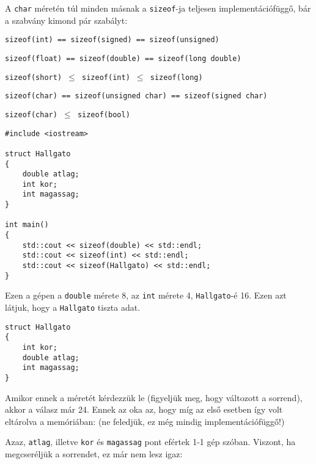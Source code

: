 \documentclass[a4paper,11.5pt,table]{article}
\begin{document}
	\medskip
	A \texttt{char} méretén túl minden másnak a \texttt{sizeof}-ja teljesen implementációfüggő, bár a szabvány kimond pár szabályt:
	\begin{center}
		\texttt{sizeof(int) == sizeof(signed) == sizeof(unsigned)}
		\smallskip
		
		\texttt{sizeof(float) == sizeof(double) == sizeof(long double)}
		\smallskip
		
		\texttt{sizeof(short) $\leq$ sizeof(int) $\leq$ sizeof(long)}
		\smallskip
		
		\texttt{sizeof(char) == sizeof(unsigned char) == sizeof(signed char)}
		\smallskip
		
		\texttt{sizeof(char) $\leq$ sizeof(bool)}
		\smallskip
	\end{center}
	\begin{lstlisting}
#include <iostream>

struct Hallgato
{
	double atlag;
	int kor;
	int magassag;
}

int main()
{
	std::cout << sizeof(double) << std::endl;
	std::cout << sizeof(int) << std::endl;
	std::cout << sizeof(Hallgato) << std::endl;
}
	\end{lstlisting}
	Ezen a gépen a \texttt{double} mérete 8, az \texttt{int} mérete 4, \texttt{Hallgato}-é 16. Ezen azt látjuk, hogy a \texttt{Hallgato} tiszta adat.
	\begin{lstlisting}
struct Hallgato
{
	int kor;
	double atlag;
	int magassag;
}
	\end{lstlisting} 
	Amikor ennek a méretét kérdezzük le (figyeljük meg, hogy változott a sorrend), akkor a válasz már 24. Ennek az oka az, hogy míg az első esetben így volt eltárolva a memóriában: (ne feledjük, ez még mindig implementációfüggő!)
	\begin{center}
	\end{center}
	Azaz, \texttt{atlag}, illetve \texttt{kor} és \texttt{magassag} pont efértek 1-1 gép szóban. Viszont, ha megcseréljük a sorrendet, ez már nem lesz igaz:
\end{document}
